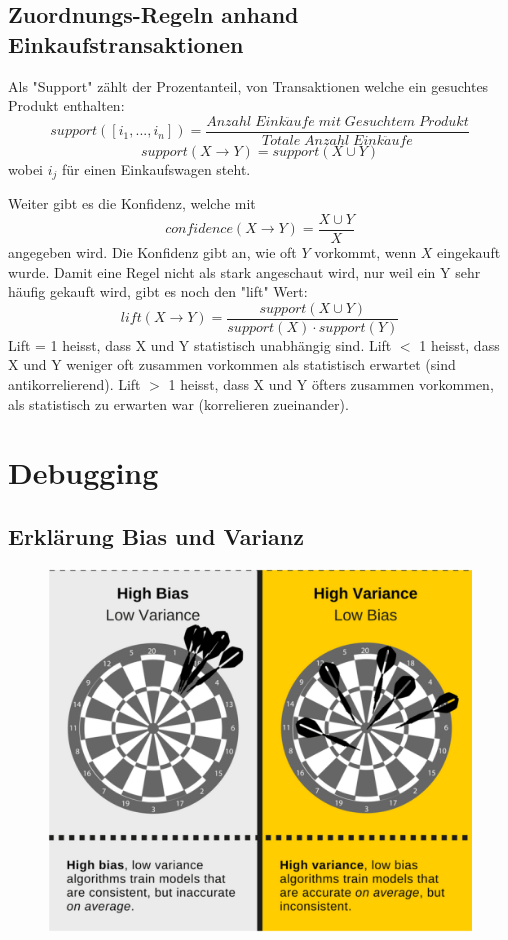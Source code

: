 \documentclass{article}
\begin{document}
	\subsection{Zuordnungs-Regeln anhand Einkaufstransaktionen}
	Als "Support" zählt der Prozentanteil, von Transaktionen welche ein gesuchtes Produkt enthalten:
	$$support([i_1,...,i_n])=\frac{Anzahl\;Eink\ddot{a}ufe\;mit\;Gesuchtem\;Produkt}{Totale\;Anzahl\;Eink\ddot{a}ufe}$$
	$$support(X\rightarrow Y)=support(X\cup Y)$$
	wobei $i_j$ für einen Einkaufswagen steht.
	
	Weiter gibt es die Konfidenz, welche mit $$confidence(X\rightarrow Y)=\frac{X \cup Y}{X}$$
	angegeben wird. Die Konfidenz gibt an, wie oft $Y$ vorkommt, wenn $X$ eingekauft wurde. Damit eine Regel nicht als stark angeschaut wird, nur weil ein Y sehr häufig gekauft wird, gibt es noch den "lift" Wert:
	$$lift(X \rightarrow Y) = \frac{support(X \cup Y)}{support(X) \cdot support(Y)}$$
	Lift = 1 heisst, dass X und Y statistisch unabhängig sind.
	Lift $<$ 1 heisst, dass X und Y weniger oft zusammen vorkommen als statistisch erwartet (sind antikorrelierend).
	Lift $>$ 1 heisst, dass X und Y öfters zusammen vorkommen, als statistisch zu erwarten war (korrelieren zueinander).
	\section{Debugging}
	\subsection{Erklärung Bias und Varianz}
	\begin{figure}[H]
		\includegraphics[width=0.6\linewidth]{beschreibung_bias_variance}
	\end{figure}
\end{document}
